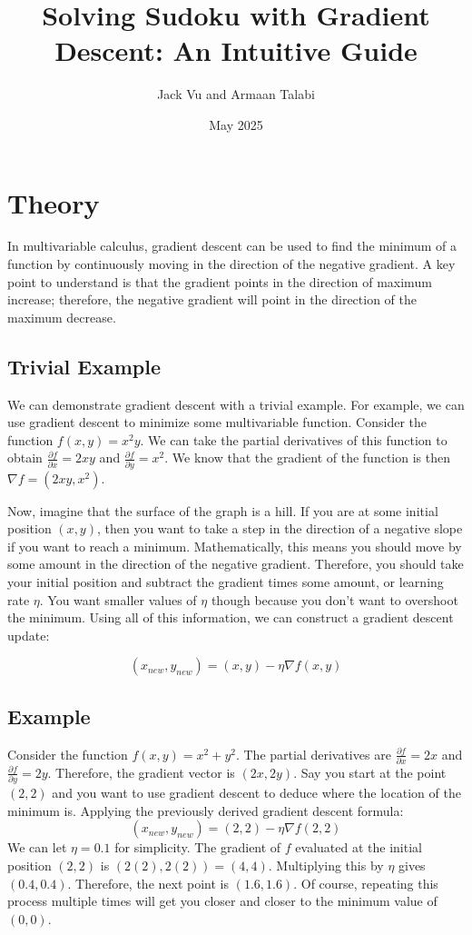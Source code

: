 \documentclass[12pt]{article}
\title{Solving Sudoku with Gradient Descent: An Intuitive Guide}
\author{Jack Vu and Armaan Talabi}
\date{May 2025}
\begin{document}
\maketitle
\section*{Theory}
In multivariable calculus, gradient descent can be used to find the minimum of a function by continuously moving in the direction of the negative gradient. A key point to understand is that the gradient points in the direction of maximum increase; therefore, the negative gradient will point in the direction of the maximum decrease.
\subsection*{Trivial Example}
We can demonstrate gradient descent with a trivial example. For example, we can use gradient descent to minimize some multivariable function. Consider the function $f(x, y) = x^2y$. We can take the partial derivatives of this function to obtain $\frac{\partial f}{\partial x} = 2xy$ and $\frac{\partial f}{\partial y} = x^2$. We know that the gradient of the function is then $\nabla f = (2xy, x^2)$.

Now, imagine that the surface of the graph is a hill. If you are at some initial position $(x, y)$, then you want to take a step in the direction of a negative slope if you want to reach a minimum. Mathematically, this means you should move by some amount in the direction of the negative gradient. Therefore, you should take your initial position and subtract the gradient times some amount, or learning rate $\eta$. You want smaller values of $\eta$ though because you don't want to overshoot the minimum. Using all of this information, we can construct a gradient descent update:

\[(x_{new}, y_{new}) = (x, y) - \eta \nabla f(x, y)\]

\subsection*{Example}
Consider the function $f(x, y) = x^2 + y^2$. The partial derivatives are $\frac{\partial f}{\partial x} = 2x$ and $\frac{\partial f}{\partial y} = 2y$. Therefore, the gradient vector is $(2x, 2y)$. Say you start at the point $(2, 2)$ and you want to use gradient descent to deduce where the location of the minimum is. Applying the previously derived gradient descent formula:
\[(x_{new}, y_{new}) = (2, 2) - \eta \nabla f(2, 2)\]
We can let $\eta = 0.1$ for simplicity. The gradient of $f$ evaluated at the initial position $(2, 2)$ is $(2(2), 2(2)) = (4, 4)$. Multiplying this by $\eta$ gives $(0.4, 0.4)$. Therefore, the next point is $(1.6, 1.6)$. Of course, repeating this process multiple times will get you closer and closer to the minimum value of $(0, 0)$.
\end{document}
